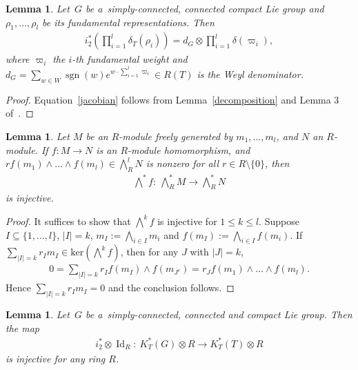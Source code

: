 \documentclass[pdftex]{sigma}
\numberwithin{equation}{section}
\newtheorem{Lemma}[Theorem]{Lemma}
\DeclareMathOperator{\Id}{Id}
\begin{document}
\begin{Lemma}
\label{Atiyahindex}
Let~$G$ be a~simply-connected, connected compact Lie group and $\rho_1, \dots, \rho_l$ be its fundamental
representations.
Then
\begin{gather}
\label{jacobian}
i_2^*\left(\prod\limits_{i=1}^l\delta_T(\rho_i)\right)=d_G\otimes\prod\limits_{i=1}^l\delta(\varpi_i),
\end{gather}
where $\varpi_i$ the $i$-th fundamental weight and $d_G=
\sum\limits_{w\in W}
\operatorname{sgn}(w)e^{w\cdot
\sum\limits_{i=1}^l\varpi_i}\in R(T)$ is the Weyl deno\-mi\-nator.
\end{Lemma}
\begin{proof}
Equation~\eqref{jacobian} follows from Lemma~\ref{decomposition} and Lemma 3 of~\cite{At2}.
\end{proof}
\begin{Lemma}
\label{wedgeinj}
Let $M$ be an $R$-module freely generated by $m_1, \dots, m_l$, and $N$ an $R$-module.
If $f: M\to N$ is an $R$-module homomorphism, and $rf(m_1)\wedge\dots\wedge f(m_l)\in \bigwedge_R^l N$ is nonzero for
all $r\in R
\setminus\{0\}$, then
\begin{gather*}
\bigwedge\nolimits^* f: \ \bigwedge\nolimits_R^*M\to \bigwedge\nolimits_R^*N
\end{gather*}
is injective.
\end{Lemma}
\begin{proof}
It suf\/f\/ices to show that $\bigwedge^k f$ is injective for $1\leq k\leq l$.
Suppose $I
\subseteq\{1, \dots, l\}$, $|I|=k$, $m_I:=\bigwedge_{i\in I}m_i$ and $f(m_I):=\bigwedge_{i\in I}f(m_i)$.
If $\sum\limits_{|I|=k}
r_Im_I\in\text{ker}(\bigwedge^k f)$, then for any $J$ with $|J|=k$,
\begin{gather*}
0=
\sum\limits_{|I|=k}
r_If(m_I)\wedge f(m_{J^c})=r_Jf(m_1)\wedge\dots\wedge f(m_l).
\end{gather*}
Hence $\sum\limits_{|I|=k}
r_Im_I=0$ and the conclusion follows.
\end{proof}
\begin{Lemma}
\label{twotorsioninj}
Let~$G$ be a~simply-connected, connected and compact Lie group.
Then the map
\begin{gather*}
i_2^*\otimes\Id_R: \ K_T^*(G)\otimes R\to K_T^*(T)\otimes R
\end{gather*}
is injective for any ring $R$.
\end{Lemma}
\end{document}
